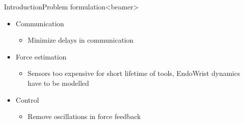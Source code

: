 \begin{frame}{Introduction}{Problem formulation}<beamer>
\begin{itemize}
\item Communication
\begin{itemize}
\item Minimize delays in communication
\end{itemize}
\item Force estimation
\begin{itemize}
\item Sensors too expensive for short lifetime of tools, EndoWrist dynamics have to be modelled
\end{itemize}
\item Control
\begin{itemize}
\item Remove oscillations in force feedback
\end{itemize}
\end{itemize}
\end{frame}